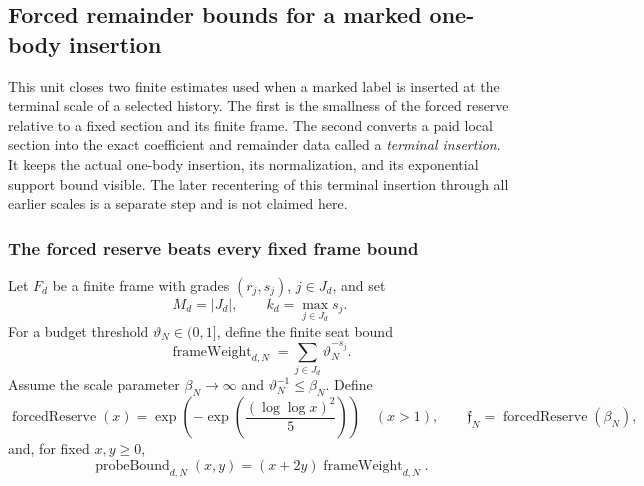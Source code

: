 \subsection{Forced remainder bounds for a marked one-body insertion}
\label{sec:ex-marked-field-local}

This unit closes two finite estimates used when a marked label is inserted
at the terminal scale of a selected history. The first is the smallness of
the forced reserve relative to a fixed section and its finite frame. The
second converts a paid local section into the exact coefficient and
remainder data called a \emph{terminal insertion}. It keeps the actual one-body
insertion, its normalization, and its exponential support bound visible.
The later recentering of this terminal insertion through all earlier scales is a separate
step and is not claimed here.

\subsubsection{The forced reserve beats every fixed frame bound}

Let $F_d$ be a finite frame with grades $(r_j,s_j)$, $j\in J_d$, and set
\[
 M_d=|J_d|,\qquad k_d=\max_{j\in J_d}s_j.
\]
For a budget threshold $\vartheta_N\in(0,1]$, define the finite seat
bound
\[
 \operatorname{frameWeight}_{d,N}=
       \sum_{j\in J_d}\vartheta_N^{-s_j}.
\]
Assume the scale parameter $\beta_N\to\infty$ and
$\vartheta_N^{-1}\leq\beta_N$. Define
\[
 \operatorname{forcedReserve}(x)=
 \exp\!\left(-\exp\!\left(\frac{(\log\log x)^2}{5}\right)\right)
 \quad(x>1),\qquad
 \mathfrak f_N=\operatorname{forcedReserve}(\beta_N),
\]
and, for fixed $x,y\geq0$,
\[
 \operatorname{probeBound}_{d,N}(x,y)=(x+2y)\operatorname{frameWeight}_{d,N}.
\]

